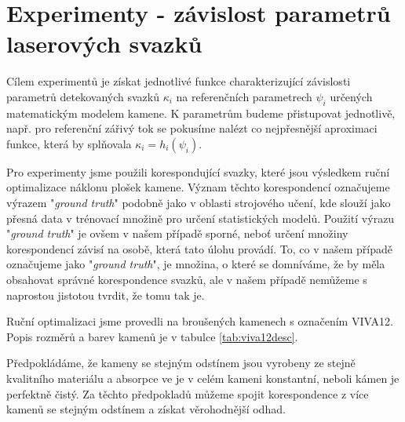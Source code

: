 \section*{Experimenty - závislost parametrů laserových svazků}

Cílem experimentů je získat jednotlivé funkce charakterizující závislosti parametrů detekovaných svazků $\kappa_i$ na referenčních parametrech $\psi_i$ určených matematickým modelem kamene. K parametrům budeme přistupovat jednotlivě, např. pro referenční zářivý tok se pokusíme nalézt co nejpřesnější aproximaci funkce, která by splňovala $\kappa_i = h_i\left(\psi_i\right)$.

Pro experimenty jsme použili korespondující svazky, které jsou výsledkem ruční optimalizace náklonu plošek kamene. Význam těchto korespondencí označujeme výrazem "\textit{ground truth}" podobně jako v oblasti strojového učení, kde slouží jako přesná data v trénovací množině pro určení statistických modelů. Použití výrazu "\textit{ground truth}" je ovšem v našem případě sporné, neboť určení množiny korespondencí závisí na osobě, která tato úlohu provádí. To, co v našem případě označujeme jako "\textit{ground truth}", je množina, o které se domníváme, že by měla obsahovat správné korespondence svazků, ale v našem případě nemůžeme s naprostou jistotou tvrdit, že tomu tak je. 

Ruční optimalizaci jsme provedli na broušených kamenech s označením VIVA12. Popis rozměrů a barev kamenů je v tabulce \ref{tab:viva12desc}. 


Předpokládáme, že kameny se stejným odstínem jsou vyrobeny ze stejně kvalitního materiálu a absorpce ve je v celém kameni konstantní, neboli kámen je perfektně čistý. Za těchto předpokladů můžeme spojit korespondence z více kamenů se stejným odstínem a získat věrohodnější odhad.    

